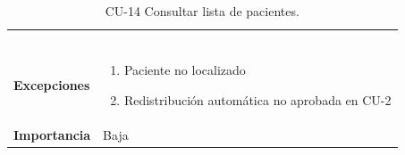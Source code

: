 \begin{table}[p]
\begin{tabularx}{\linewidth}{ p{} p{} }
\begin{enumerate}
		\end{enumerate}\\
		\textbf{Excepciones}          & 
        \begin{enumerate}
			\def\labelenumi{\arabic{enumi}.}
			\tightlist
			\item Paciente no localizado
			\item Redistribución automática no aprobada en CU-2
		\end{enumerate}\\
		\textbf{Importancia}          & Baja \\
		\bottomrule
	\end{tabularx}
	\caption{CU-14 Consultar lista de pacientes.}
\end{table}

